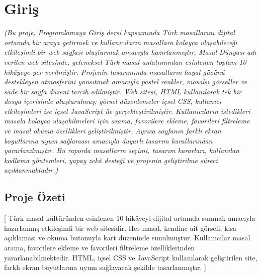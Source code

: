 \documentclass[12pt,a4paper]{article}
\newcommand{\aciklama}[1]{{\color{gray}\itshape (#1)}}
\begin{document}
\section{Giriş}
\aciklama{Bu proje, Programlamaya Giriş dersi kapsamında Türk masallarını dijital ortamda bir araya getirmek ve kullanıcıların masallara kolayca ulaşabileceği etkileşimli bir web sayfası oluşturmak amacıyla hazırlanmıştır. Masal Dünyası adı verilen web sitesinde, geleneksel Türk masal anlatımından esinlenen toplam 10 hikâyeye yer verilmiştir. Projenin tasarımında masalların hayal gücünü destekleyen atmosferini yansıtmak amacıyla pastel renkler, masalsı görseller ve sade bir sayfa düzeni tercih edilmiştir. Web sitesi, HTML kullanılarak tek bir dosya içerisinde oluşturulmuş; görsel düzenlemeler içsel CSS, kullanıcı etkileşimleri ise içsel JavaScript ile gerçekleştirilmiştir. Kullanıcıların istedikleri masala kolayca ulaşabilmeleri için arama, favorilere ekleme, favorileri filtreleme ve masal okuma özellikleri geliştirilmiştir. Ayrıca sayfanın farklı ekran boyutlarına uyum sağlaması amacıyla duyarlı tasarım kurallarından yararlanılmıştır. Bu raporda masalların seçimi, tasarım kararları, kullanılan kodlama yöntemleri, yapay zekâ desteği ve projenin geliştirilme süreci açıklanmaktadır.}

\subsection{Proje Özeti}
[ Türk masal kültüründen esinlenen 10 hikâyeyi dijital ortamda sunmak amacıyla hazırlanmış etkileşimli bir web sitesidir. Her masal, kendine ait görseli, kısa açıklaması ve okuma butonuyla kart düzeninde sunulmuştur. Kullanıcılar masal arama, favorilere ekleme ve favorileri filtreleme özelliklerinden yararlanabilmektedir. HTML, içsel CSS ve JavaScript kullanılarak geliştirilen site, farklı ekran boyutlarına uyum sağlayacak şekilde tasarlanmıştır. ]
\end{document}
